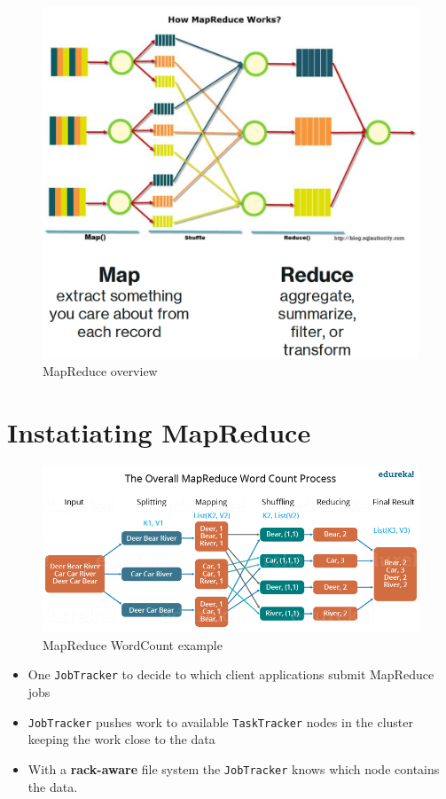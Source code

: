 \begin{figure}[htbp]
   \centering
   \includegraphics[width=0.4\columnwidth]{images/14/mapreduce_overview.png}
   \caption{MapReduce overview}
   \label{fig:14/mapreduce_overview}
\end{figure}


\newpage
\section{Instatiating MapReduce}
\begin{figure}[htbp]
   \centering
   \includegraphics{images/14/mapreduce_wordcount.png}
   \caption{MapReduce WordCount example}
   \label{fig:14/mapreduce_wordcount}
\end{figure}

\begin{itemize}
   \item One \texttt{JobTracker} to decide to which client applications submit MapReduce jobs
   \item \texttt{JobTracker} pushes work to available \texttt{TaskTracker} nodes in the cluster keeping the work close to the data
   \item With a \textbf{rack-aware} file system the \texttt{JobTracker} knows which node contains the data.
\end{itemize}

